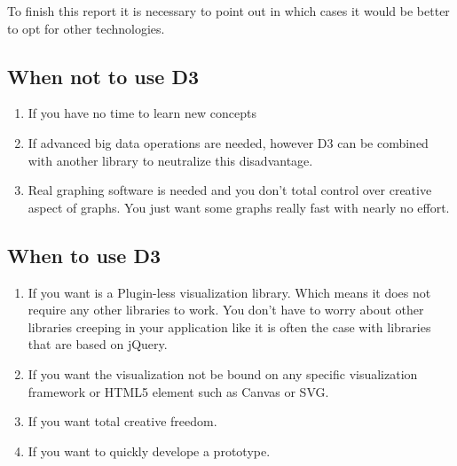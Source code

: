 \documentclass{bioinfo}
\begin{document}
To finish this report it is necessary to point out in which cases it would be better to opt for other technologies.

\subsection{When not to use D3}
\begin{enumerate}
\item If you have no time to learn new concepts
\item If advanced big data operations are needed, however D3 can be combined with another library to neutralize this disadvantage.
\item Real graphing software is needed and you don't total control over creative aspect of graphs. You just want some graphs really fast with nearly no effort. 
\end{enumerate}

\subsection{When to use D3} 
\begin{enumerate}
\item If you want is a Plugin-less visualization library. Which means it does not require any other libraries to work. You don't have to worry about other libraries creeping in your application like it is often the case with libraries that are based on jQuery.
\item If you want the visualization not be bound on any specific visualization framework or HTML5 element such as Canvas or SVG.
\item If you want total creative freedom.
\item If you want to quickly develope a prototype.
\end{enumerate}
\end{document}
